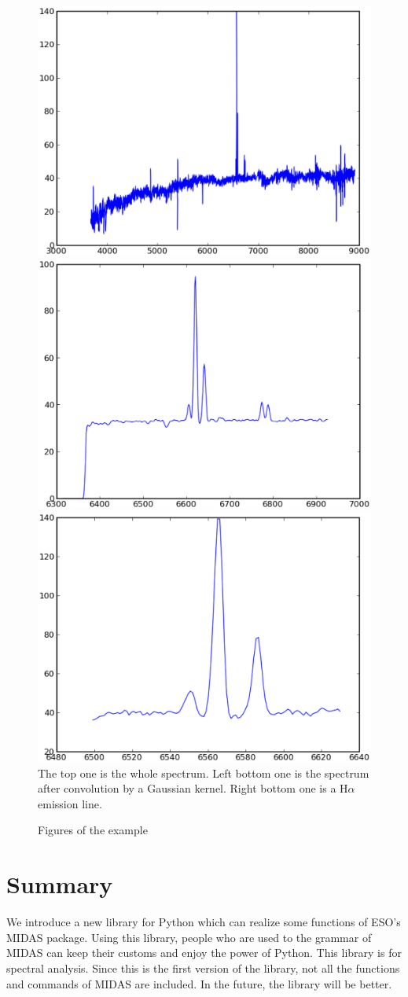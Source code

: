 \begin{figure}[!hb]
\begin{center}
\caption{Figures of the example}
\label{fig}
\includegraphics[width=1.\textwidth, height=.2\textheight]{part9/Song_P65/spectra}\\

\includegraphics[width=.46\textwidth]{part9/Song_P65/part}
\includegraphics[width=.46\textwidth]{part9/Song_P65/halpha}\\
The top one is the whole spectrum. Left bottom one is the spectrum after convolution by a Gaussian kernel. Right bottom one is a H$\alpha$ emission line.
\end{center}
\end{figure}
	  \section{Summary}
We introduce a new library for Python which can realize some functions of ESO's MIDAS package. Using this library, people who are used to the grammar of MIDAS can keep their customs and enjoy the power of Python. This library is for spectral analysis. Since this is the first version of the library, not all the functions and commands of MIDAS are included. In the future, the library will be better.



